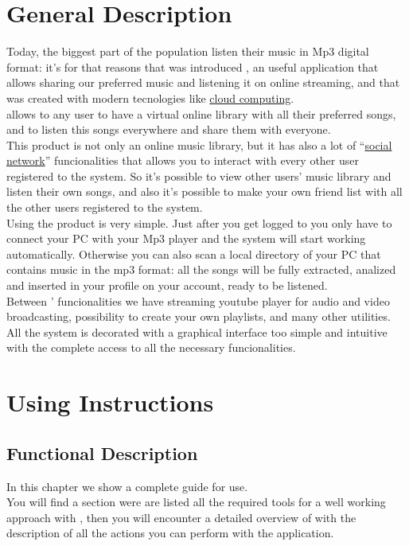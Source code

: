 \chapter{General Description}
\thispagestyle{fancy}
Today, the biggest part of the population listen their music in Mp3 digital
format: it's for that reasons that was introduced , an useful
application that allows sharing our preferred music and listening it on online
streaming, and that was created with modern tecnologies like \underline{cloud
computing}.\\

 allows to any user to have a virtual online library with all their
preferred songs, and to listen this songs everywhere and share them with
everyone.\\

This product is not only an online music library, but it has also a lot of
``\underline{social network}'' funcionalities that allows you to interact with every other user
registered to the system. So it's possible to view other users' music library
and listen their own songs, and also it's possible to make your own friend list
with all the other users registered to the system.\\

Using the product is very simple. Just after you get logged to  you
only have to connect your PC with your Mp3 player and the system will start
working automatically. Otherwise you can also scan a local directory of your PC
that contains music in the mp3 format: all the songs will be fully extracted,
analized and inserted in your profile on your  account, ready to be
listened.\\

Between ' funcionalities we have streaming youtube player for audio
and video broadcasting, possibility to create your own playlists, and many other
utilities.\\

All the system is decorated with a graphical interface  too simple and intuitive
with the complete access to all the necessary funcionalities.\\


\chapter{Using Instructions}
\thispagestyle{fancy}

\section{Functional Description}
In this chapter we show a complete guide for  use.\\
You will find a section were are listed all the required tools for a well
working approach with , then you will encounter a detailed overview
of  with the description of all the actions you can perform with the
application.

